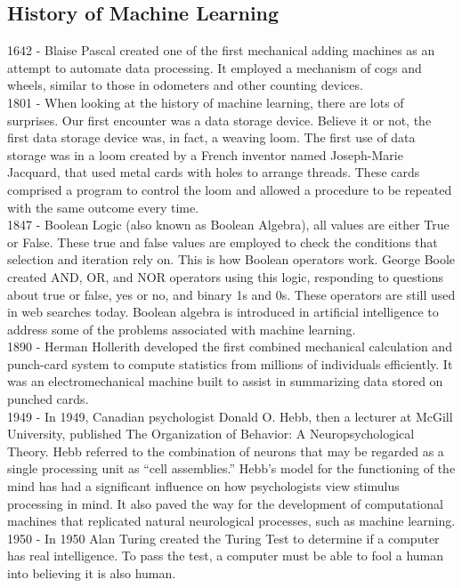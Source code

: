 \documentclass[english,12pt,oneside,a4paper]{article}
\begin{document}
\begin{center}
		\subsection{History of Machine Learning}
		1642 - Blaise Pascal created one of the first mechanical adding machines as an attempt to automate data processing. It employed a mechanism of cogs and wheels, similar to those in odometers and other counting devices.\\
		1801 - When looking at the history of machine learning, there are lots of surprises. Our first encounter was a data storage device. Believe it or not, the first data storage device was, in fact, a weaving loom. The first use of data storage was in a loom created by a French inventor named Joseph-Marie Jacquard, that used metal cards with holes to arrange threads. These cards comprised a program to control the loom and allowed a procedure to be repeated with the same outcome every time.\\
		1847 - Boolean Logic (also known as Boolean Algebra), all values are either True or False. These true and false values are employed to check the conditions that selection and iteration rely on. This is how Boolean operators work. George Boole created AND, OR, and NOR operators using this logic, responding to questions about true or false, yes or no, and binary 1s and 0s. These operators are still used in web searches today.
		Boolean algebra is introduced in artificial intelligence to address some of the problems associated with machine learning.\\
		1890 - Herman Hollerith developed the first combined mechanical calculation and punch-card system to compute statistics from millions of individuals efficiently. It was an electromechanical machine built to assist in summarizing data stored on punched cards.\\
		1949 - In 1949, Canadian psychologist Donald O. Hebb, then a lecturer at McGill University, published The Organization of Behavior: A Neuropsychological Theory. Hebb referred to the combination of neurons that may be regarded as a single processing unit as “cell assemblies.”
		Hebb’s model for the functioning of the mind has had a significant influence on how psychologists view stimulus processing in mind. It also paved the way for the development of computational machines that replicated natural neurological processes, such as machine learning.\\
		1950 - In 1950 Alan Turing created the Turing Test to determine if a computer has real intelligence. To pass the test, a computer must be able to fool a human into believing it is also human.

\end{center}
\end{document}
